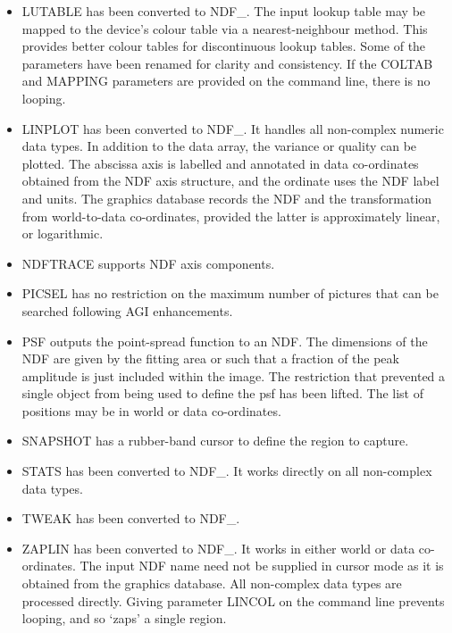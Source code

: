 {\begin{itemize}
  \item LUTABLE has been converted to NDF\_.  The input lookup table
    may be mapped to the device's colour table via a nearest-neighbour
    method.  This provides better colour tables for discontinuous
    lookup tables.  Some of the parameters have been
    renamed for clarity and consistency. If the COLTAB and MAPPING
    parameters are provided on the command line, there is no looping.

  \item LINPLOT has been converted to NDF\_.  It handles all non-complex
    numeric data types.  In addition to the data array, the variance
    or quality can be plotted.  The abscissa axis is labelled and
    annotated in data co-ordinates obtained from the NDF axis
    structure, and the ordinate uses the NDF label and units.  The
    graphics database records the NDF and the transformation from
    world-to-data co-ordinates, provided the latter is approximately
    linear, or logarithmic.

  \item NDFTRACE supports NDF axis components.

  \item PICSEL has no restriction on the maximum number of pictures that
    can be searched following AGI enhancements.

  \item PSF outputs the point-spread function to an NDF.  The dimensions
    of the NDF are given by the fitting area or such that a fraction
    of the peak amplitude is just included within the image.  The
    restriction that prevented a single object from being used to
    define the psf has been lifted.  The list of positions may be in
    world or data co-ordinates.

  \item SNAPSHOT has a rubber-band cursor to define the region to capture.

  \item STATS has been converted to NDF\_.  It works directly on all
    non-complex data types.

  \item TWEAK has been converted to NDF\_.

  \item ZAPLIN has been converted to NDF\_.  It works in either world or
    data co-ordinates.  The input NDF name need not be supplied in
    cursor mode as it is obtained from the graphics database.  All
    non-complex data types are processed directly.  Giving parameter
    LINCOL on the command line prevents looping, and so `zaps' a
    single region.


\end{itemize}}
